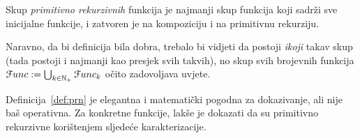 \begin{definicija}\label{def:prn}
Skup \emph{primitivno rekurzivnih} funkcija je najmanji skup funkcija koji sadrži sve inicijalne funkcije, i zatvoren je na kompoziciju i na primitivnu rekurziju.
\end{definicija}

Naravno, da bi definicija bila dobra, trebalo bi vidjeti da postoji \emph{ikoji} takav skup (tada postoji i najmanji kao presjek svih takvih), no skup svih brojevnih funkcija $\mathcal Func:=\bigcup_{k\in{\mathbb N}_+}\mathcal Func_k$ očito zadovoljava uvjete.

Definicija~\ref{def:prn} je elegantna i matematički pogodna za dokazivanje, ali nije baš operativna. Za konkretne funkcije, lakše je dokazati da su primitivno rekurzivne korištenjem sljedeće karakterizacije.

